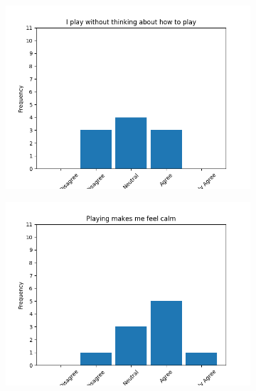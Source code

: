 \documentclass{article}
\begin{document}
\begin{figure}[!ht]
\centering
\begin{subfigure}{.5\textwidth}
    \centering
    \includegraphics[width=\textwidth]{images/questions/8}
\end{subfigure}%
\begin{subfigure}{.5\textwidth}
    \centering
    \includegraphics[width=\textwidth]{images/questions/9}
\end{subfigure}
\begin{subfigure}{.5\textwidth}
    \centering

\end{subfigure}
\end{figure}
\end{document}
